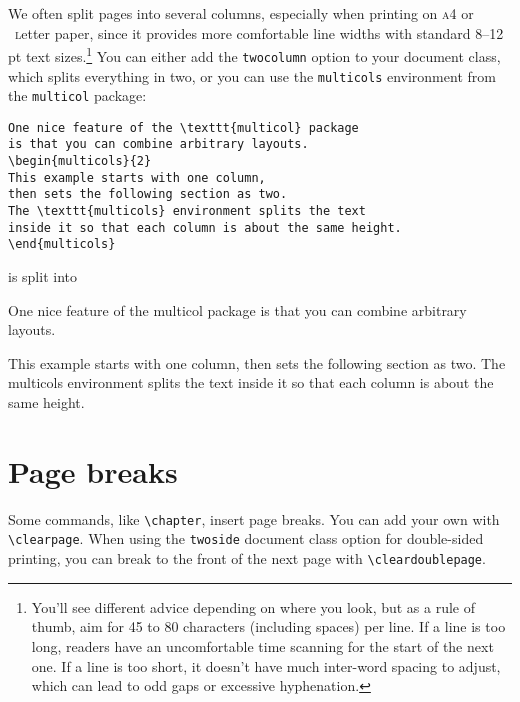 We often split pages into several columns, especially when printing on
\textsc{a4} or ~\textsc{l}etter paper,
since it provides more comfortable line widths with standard
8--12\,pt text sizes.\punckern\footnote{You'll see different advice depending
on where you look, but as a rule of thumb,
aim for 45 to 80 characters (including spaces) per line.
If a line is too long, readers have an uncomfortable time scanning for
the start of the next one.
If a line is too short, it doesn't have much inter-word spacing to adjust,
which can lead to odd gaps or excessive hyphenation.}
You can either add the \texttt{twocolumn} option to your document class,
which splits everything in two, or you can use the \texttt{multicols}
environment from the \texttt{multicol} package:
\begin{leftfigure}
\begin{lstlisting}
One nice feature of the \texttt{multicol} package
is that you can combine arbitrary layouts.
\begin{multicols}{2}
This example starts with one column,
then sets the following section as two.
The \texttt{multicols} environment splits the text
inside it so that each column is about the same height.
\end{multicols}
\end{lstlisting}
\end{leftfigure}
is split into
\begin{leftfigure}
\lm%
One nice feature of the {\lt multicol} package
is that you can combine arbitrary layouts.
\begin{multicols}{2}
This example starts with one column,
then sets the following section as two.
The \mbox{\lt multicols} environment splits the text
inside it so that each column is about the same height.
\end{multicols}
\end{leftfigure}

\section{Page breaks}

Some commands, like \verb|\chapter|, insert page breaks.
You can add your own with \verb|\clearpage|.
When using the \texttt{twoside} document class option for double-sided
printing, you can break to the front of the next page with
\verb|\cleardoublepage|.

